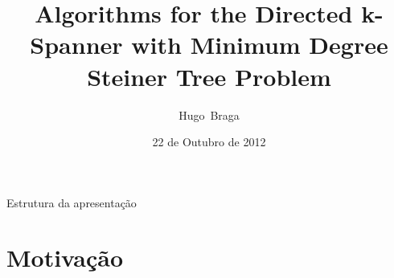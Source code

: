 \documentclass[10pt]{beamer}
\title[DEFESA] %
{Algorithms for the Directed k-Spanner with Minimum Degree Steiner Tree Problem}
\author[hugo] %
{Hugo~Braga}
\institute[UFBA] %
{
  Programa de Pós-Graduação em Mecatrônica\\
  Universidadde Federal da Bahia\\
  Defesa de Mestrado\\
  Orientador: Dr. Flávio Assis}
\date[Short Occasion] %
{22 de Outubro de 2012}
\begin{document}
\begin{frame}
  \titlepage
\end{frame}

\begin{frame}[allowframebreaks]{Estrutura da apresentação}
  \tableofcontents
\end{frame}




\section{Motivação}
\end{document}
